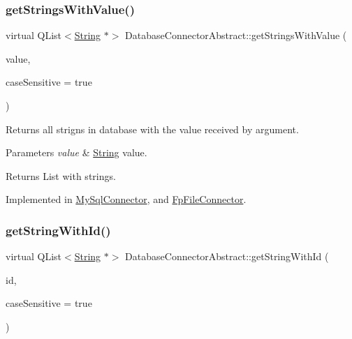\mbox{\label{classDatabaseConnectorAbstract_a1d33547045c5f8619f44290c932edb1b}} 
\subsubsection{\texorpdfstring{get\+Strings\+With\+Value()}{getStringsWithValue()}}
{\footnotesize\ttfamily virtual Q\+List$<$\mbox{\hyperlink{classString}{String}} $\ast$$>$ Database\+Connector\+Abstract\+::get\+Strings\+With\+Value (\begin{DoxyParamCaption}\item[{const Q\+String \&}]{value,  }\item[{bool}]{case\+Sensitive = {\ttfamily true} }\end{DoxyParamCaption})\hspace{0.3cm}{\ttfamily [pure virtual]}}



Returns all strigns in database with the value received by argument. 


\begin{DoxyParams}{Parameters}
{\em value} & \mbox{\hyperlink{classString}{String}} value. \\
\hline
\end{DoxyParams}
\begin{DoxyReturn}{Returns}
List with strings. 
\end{DoxyReturn}


Implemented in \mbox{\hyperlink{classMySqlConnector_ae7440816a5bda9e63ea526656c4001f5}{My\+Sql\+Connector}}, and \mbox{\hyperlink{classFpFileConnector_a72a6ca5a5b8a44783d2ed990b111675b}{Fp\+File\+Connector}}.

\mbox{\label{classDatabaseConnectorAbstract_a757f25feaf50af012d25db8f27b1fef4}} 
\subsubsection{\texorpdfstring{get\+String\+With\+Id()}{getStringWithId()}}
{\footnotesize\ttfamily virtual Q\+List$<$\mbox{\hyperlink{classString}{String}} $\ast$$>$ Database\+Connector\+Abstract\+::get\+String\+With\+Id (\begin{DoxyParamCaption}\item[{const Q\+String \&}]{id,  }\item[{bool}]{case\+Sensitive = {\ttfamily true} }\end{DoxyParamCaption})\hspace{0.3cm}{\ttfamily [pure virtual]}}



